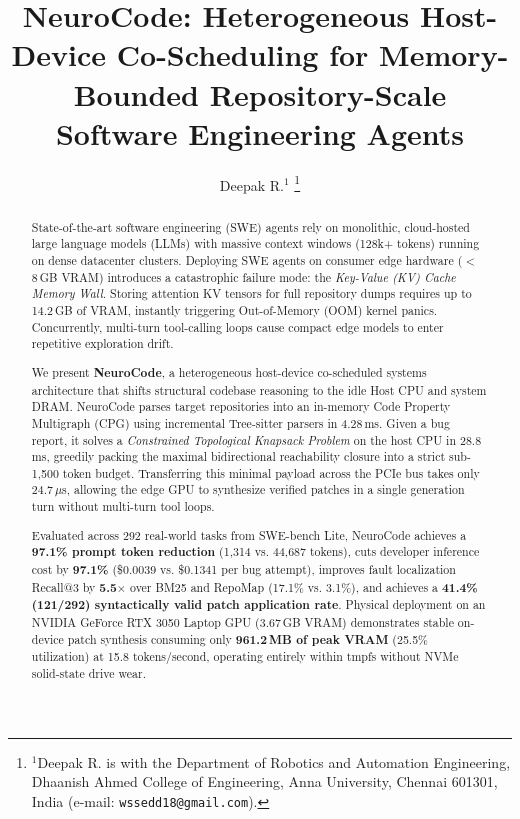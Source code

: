 \documentclass[letterpaper, 10 pt, conference]{ieeeconf}
\title{\LARGE \bf
NeuroCode: Heterogeneous Host-Device Co-Scheduling for Memory-Bounded Repository-Scale Software Engineering Agents}
\author{Deepak R.$^{1}$%
\thanks{$^{1}$Deepak R. is with the Department of Robotics and Automation Engineering, Dhaanish Ahmed College of Engineering, Anna University, Chennai 601301, India (e-mail: \texttt{wssedd18@gmail.com}).}%
}
\begin{document}
\maketitle
\thispagestyle{empty}
\pagestyle{empty}

\begin{abstract}
State-of-the-art software engineering (SWE) agents rely on monolithic, cloud-hosted large language models (LLMs) with massive context windows (128k+ tokens) running on dense datacenter clusters. Deploying SWE agents on consumer edge hardware ($<$ 8\,GB VRAM) introduces a catastrophic failure mode: the \textit{Key-Value (KV) Cache Memory Wall}. Storing attention KV tensors for full repository dumps requires up to 14.2\,GB of VRAM, instantly triggering Out-of-Memory (OOM) kernel panics. Concurrently, multi-turn tool-calling loops cause compact edge models to enter repetitive exploration drift. 

We present \textbf{NeuroCode}, a heterogeneous host-device co-scheduled systems architecture that shifts structural codebase reasoning to the idle Host CPU and system DRAM. NeuroCode parses target repositories into an in-memory Code Property Multigraph (CPG) using incremental Tree-sitter parsers in 4.28\,ms. Given a bug report, it solves a \textit{Constrained Topological Knapsack Problem} on the host CPU in 28.8\,ms, greedily packing the maximal bidirectional reachability closure into a strict sub-1,500 token budget. Transferring this minimal payload across the PCIe bus takes only 24.7\,$\mu$s, allowing the edge GPU to synthesize verified patches in a single generation turn without multi-turn tool loops. 

Evaluated across 292 real-world tasks from SWE-bench Lite, NeuroCode achieves a \textbf{97.1\% prompt token reduction} (1,314 vs. 44,687 tokens), cuts developer inference cost by \textbf{97.1\%} (\$0.0039 vs. \$0.1341 per bug attempt), improves fault localization Recall@3 by \textbf{5.5$\times$} over BM25 and RepoMap (17.1\% vs. 3.1\%), and achieves a \textbf{41.4\% (121/292) syntactically valid patch application rate}. Physical deployment on an NVIDIA GeForce RTX 3050 Laptop GPU (3.67\,GB VRAM) demonstrates stable on-device patch synthesis consuming only \textbf{961.2\,MB of peak VRAM} (25.5\% utilization) at 15.8 tokens/second, operating entirely within tmpfs without NVMe solid-state drive wear.
\end{abstract}









\end{document}

